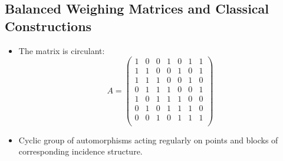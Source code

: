 \documentclass{beamer}
\begin{document}




\subsection{Balanced Weighing Matrices and Classical Constructions}

\begin{frame}

  \begin{itemize}
  \item The matrix is circulant:
    \[
      A=
      \left(
        \begin{array}{ccccccc}
          1&0&0&1&0&1&1\\
          1&1&0&0&1&0&1\\
          1&1&1&0&0&1&0\\
          0&1&1&1&0&0&1\\
          1&0&1&1&1&0&0\\
          0&1&0&1&1&1&0\\
          0&0&1&0&1&1&1\\
        \end{array}
      \right)
    \]
  \item Cyclic group of automorphisms acting regularly on points and blocks of
    corresponding incidence structure.
  \end{itemize}

\end{frame}
\end{document}

